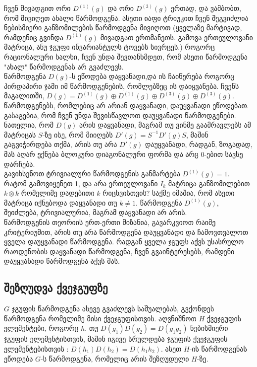 \documentclass[12pt]{article}
\begin{document}
\begin{sloppypar}
ჩვენ მივადგით ორი $D^{(1)}(g)$ და ორი $D^{(3)}(g)$ ერთად, და ვამბობთ, რომ მივიღეთ ახალი წარმოდგენა. ასეთი იაფი ტრიუკით ჩვენ შეგვიძლია ნებისმიერი განზომილების წარმოდგენა მივიღოთ (ყველაზე მარტივად, რამდენიც გვინდა $D^{(1)}(g)$ მივადგათ ერთმანეთს. გამოვა ერთეულოვანი მატრიცა, ანუ ჯგუფი ინვარიანტულს ტოვებს სივრცეს.) როგორც რაციონალური ხალხი, ჩვენ უნდა შევთანხმდეთ, რომ ასეთი წარმოდგენა "ახალ" წარმოდგენას არ გვაძლევს. \\

წარმოდგენა $D(g)$-ს ეწოდება დაყვანადი,და ის ჩაიწერება როგორც პირდაპირი ჯამი იმ წარმოდგენების, რომლებზეც ის დაიყვანება. ჩვენს მაგალითში, $D(g) = D^{(1)}(g)  \oplus  D^{(1)}(g)  \oplus D^{(3)}(g)   \oplus D^{(3)}(g)$.\\

წარმოდგენებს, რომლებიც არ არიან დაყვანადი, დაუყვანადი ეწოდებათ. გასაგებია, რომ ჩვენ უნდა შევისწავლოთ დაუყვანადი წარმოდგენები. \\

ნათელია, რომ $D(g)$ არის დაყვანადი, მაგრამ თუ ვინმე გაამრავლებს ამ მატრიცას $S$-ზე ისე, რომ მიიღებს $D'(g) = S^{-1}D'(g)S$, მაშინ გაგვიჭირდება თქმა, არის თუ არა $D'(g)$ დაუყვანადი, რადგან, ზოგადად, მას აღარ ექნება ბლოკური დიაგონალური ფორმა და არც 0-ებით სავსე დარჩება.\\

გავიხსენოთ ტრივიალური წარმოდგენის განმარტება $D^{(1)}(g) = 1$. რატომ გამოვიყენეთ 1, და არა ერთეულოვანი $I_k$ მატრიცა განზომილებით $k\otimes k$ რომელიმე დადებითი $k$ რიცხვისთვის? საქმე იმაშია, რომ ასეთი მატრიცა იქნებოდა დაყვანადი თუ $k \neq 1$. წარმოდგენა $D^{(1)}(g)$, შეიძლება, ტრივიალურია, მაგრამ დაყვანადი არ არის.\\

წარმოდგენის თეორიის ერთ-ერთი მიზანია, გავარკვიოთ რაიმე კრიტერიუმით, არის თუ არა წარმოდგენა დაუყვანადი და ჩამოვთვალოთ ყველა დაუყვანადი წარმოდგენა. რადგან ყველა ჯგუფს აქვს უსასრულო რაოდენობის დაყვანადი წარმოდგენა, ჩვენ გვაინტერესებს, რამდენი დაუყვანადი წარმოდგენა აქვს მას.

\subsection{შეზღუდვა ქვეჯგუფზე}

$G$ ჯგუფის წარმოდგენა ასევე გვაძლევს საშუალებას, გვქონდეს წარმოდგენა რომელიმე მისი ქვეჯგუფისთვის. აღვნიშნოთ $H$ ქვეჯგუფის ელემენტები, როგორც $h$. თუ $D(g_1)D(g_2) = D(g_1 g_2)$ ნებისმიერი ჯგუფის ელემენტისთვის, მაშინ იგივე სრულდება ჯგუფის ქვეჯგუფის ელემენტებისთვის : $D(h_1)D(h_2) = D(h_1 h_2)$. ასეთ $H$-ის წარმოდგენას ეწოდება $G$-ს წარმოდგენა, რომელიც არის შეზღუდული $H$-ზე.\\


\end{sloppypar}
\end{document}
